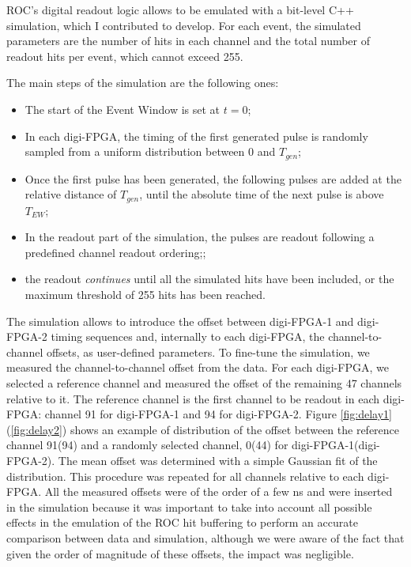 ROC's digital readout logic allows to be 
emulated with a bit-level C++ simulation, 
which I contributed to develop. 
For each event, the simulated parameters 
are the number of hits in each channel and the total 
number of readout hits per event, which cannot exceed 255. 


The main steps of the simulation are the following ones:
\begin{itemize}
\item
  The start of the Event Window is set at $t=0$;
\item
  In each digi-FPGA, the timing of the first generated pulse 
  is randomly sampled from a uniform distribution between 0 and $T_{gen}$;
\item
Once the first pulse has been generated, the following pulses are 
added at the relative distance of $T_{gen}$,
  until the absolute time of the next pulse is above $T_{EW}$;
\item
  In the readout part of the simulation, 
  the pulses are readout following a predefined channel readout ordering;; 
\item
  the readout \textit{continues} until all the simulated hits 
  have been included, or the maximum threshold of 255 hits has been reached.
\end{itemize}
The simulation allows to introduce the offset between digi-FPGA-1 
and digi-FPGA-2 timing sequences and, 
internally to each digi-FPGA, the channel-to-channel 
offsets, as user-defined parameters.
To fine-tune the simulation, we measured the channel-to-channel 
offset from the data. For each digi-FPGA, we selected 
a reference channel
and measured the offset of the 
remaining 47 channels relative to it.
The reference channel is the first channel to 
be readout in each digi-FPGA: channel 91 for 
digi-FPGA-1 and 94 for digi-FPGA-2. 
Figure \ref{fig:delay1}(\ref{fig:delay2}) shows an example of 
distribution of the offset between the reference 
channel 91(94) and a randomly selected channel, 0(44) for 
digi-FPGA-1(digi-FPGA-2). 
The mean offset was determined with a simple 
Gaussian fit of the distribution. 
This procedure was repeated for all channels 
relative to each digi-FPGA.
All the measured offsets were of the order of a 
few ns and were inserted in the simulation because 
it was important to take into account all possible 
effects in the emulation of the ROC hit buffering 
to perform an accurate comparison between data and 
simulation, although we were aware of the fact that 
given the order of magnitude of these offsets, the 
impact was negligible.

